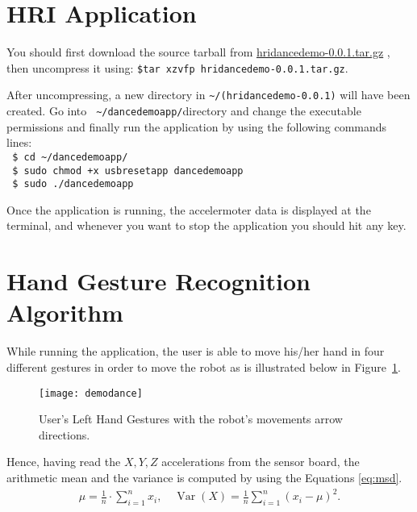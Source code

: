 \section{HRI Application}

You should first download the source tarball from 
\href{https://sites.google.com/site/perezxochicale/projects/demodance/cpp-source-code/hridancedemo-0.0.1.tar.gz}{hridancedemo-0.0.1.tar.gz}
, then uncompress it using: \verb|$tar xzvfp hridancedemo-0.0.1.tar.gz|.

After uncompressing, a new directory in \verb|~/(hridancedemo-0.0.1)| will have been
created. Go into \verb| ~/dancedemoapp/|directory and 
change the executable permissions and finally run the application by using the following commands lines:\\

\verb| $ cd ~/dancedemoapp/|  \\

\verb| $ sudo chmod +x usbresetapp dancedemoapp|  \\

\verb| $ sudo ./dancedemoapp|

Once the application is running, the accelermoter data is displayed at the terminal,
and whenever you want to stop the application you should hit any key.

\section{Hand Gesture Recognition Algorithm}
While running the application, the user is able to move his/her hand in four different gestures in order to move the robot
as is illustrated below in Figure~\ref{fig:pfs}.
\begin{figure}[h!]
  \begin{center}
  \texttt{[image: demodance]}
    \caption{User's Left Hand Gestures with the robot's movements arrow directions.}
    \label{fig:pfs}
  \end{center}
\end{figure}


Hence, having read the $X, Y, Z$ accelerations from the sensor board, the arithmetic mean and the variance 
is computed by using the Equations \ref{eq:msd}.
\begin{eqnarray}
 \mu =\frac{1}{n}\cdot \sum_{i=1}^n{x_i},  \quad \operatorname{Var}(X)= \frac{1}{n} \sum_{i=1}^n (x_i - \mu)^2. 
             \label{eq:msd}
\end{eqnarray}

